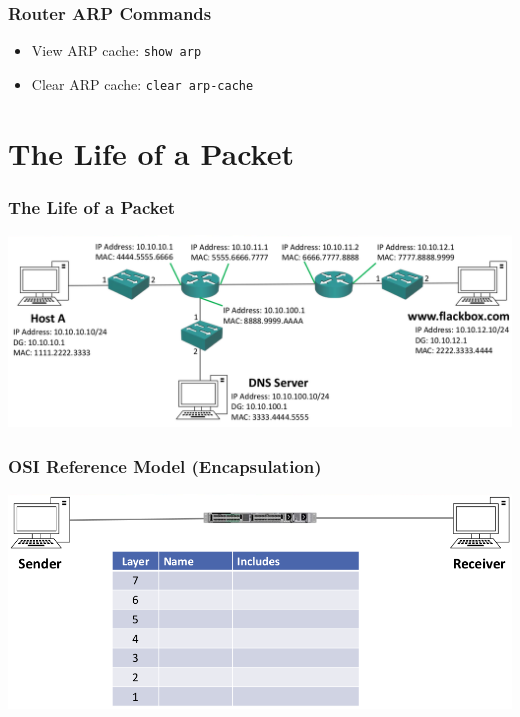 \documentclass[pdflatex,compress,mathserif]{beamer}
\begin{document}
\begin{frame}
	\frametitle{Router ARP Commands}
	\begin{itemize}
		\item View ARP cache: \texttt{show arp}
		\item Clear ARP cache: \texttt{clear arp-cache}
	\end{itemize}
\end{frame}

\section{The Life of a Packet}

\begin{frame}
	\frametitle{The Life of a Packet}
	\begin{center}
		\includegraphics[width=\linewidth]{img/img14}
	\end{center}
\end{frame}

\begin{frame}
	\frametitle{OSI Reference Model (Encapsulation)}
	\begin{center}
		\includegraphics[width=\linewidth]{img/img65}
	\end{center}
\end{frame}
\end{document}
